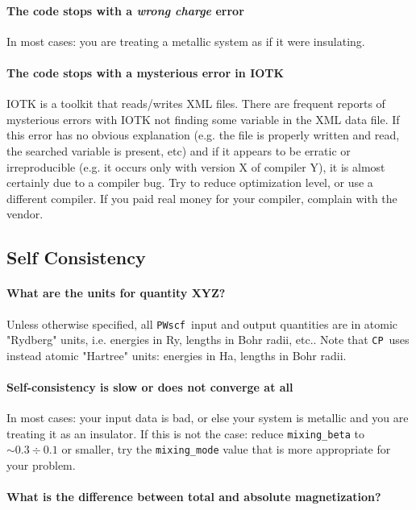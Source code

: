 \documentclass[12pt,a4paper]{article}
\def\PWscf{\texttt{PWscf}}
\def\CP{\texttt{CP}}
\begin{document}
\paragraph{The code stops with a {\em wrong charge} error}

In most cases: you are treating a metallic system
as if it were insulating.

\paragraph{The code stops with a mysterious error in IOTK}

IOTK is a toolkit that reads/writes XML files. There are frequent
reports of mysterious errors with IOTK not finding some variable
in the XML data file. If this error has no obvious explanation 
(e.g. the file is properly written and read, the searched variable
is present, etc) and if it appears to be erratic or irreproducible
(e.g. it occurs only with version X of compiler Y), it is almost
certainly due to a compiler bug. Try to reduce optimization level,
or  use a different compiler. If you paid real money for your 
compiler, complain with the vendor.

\subsection{Self Consistency}

\paragraph{What are the units for quantity XYZ?}

Unless otherwise specified, all \PWscf\ input and output
quantities are in atomic "Rydberg" units, i.e. energies in Ry, lengths
in Bohr radii, etc.. Note that \CP\ uses instead atomic "Hartree" 
units: energies in Ha, lengths in Bohr radii. 

\paragraph{Self-consistency is slow or does not converge at all}

In most cases: your input data is bad, or else your system is metallic
and you are treating it as an insulator. If this is not the case:
reduce \texttt{mixing\_beta} to $\sim 0.3\div 0.1$ or smaller, 
try the \texttt{mixing\_mode} value that is more
  appropriate for your problem.


\paragraph{What is the difference between total and absolute magnetization?}
\end{document}
